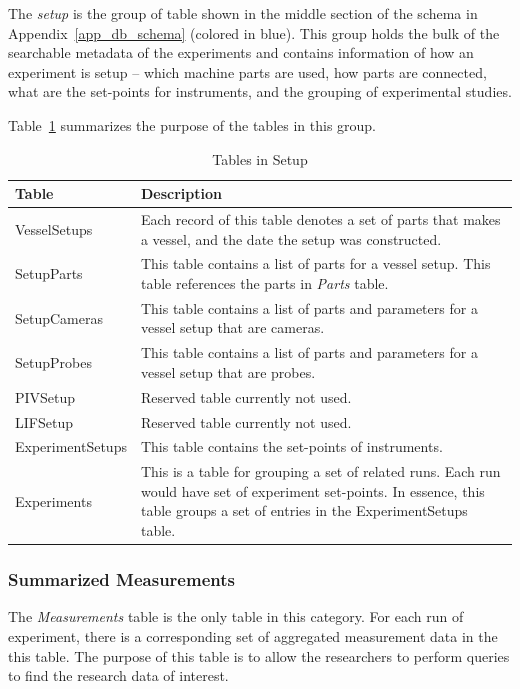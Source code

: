 \documentclass{sig-alternate}
\begin{document}
The \emph{setup} is the group of table shown in the middle section of the schema in Appendix~\ref{app_db_schema} (colored in blue). This group holds the bulk of the searchable metadata of the experiments and contains information of how an experiment is setup -- which machine parts are used, how parts are connected, what are the set-points for instruments, and the grouping of experimental studies.

Table~\ref{tb_tables_in_setup} summarizes the purpose of the tables in this group.

\begin{table}[h]
\centering
\caption{Tables in Setup}\label{tb_tables_in_setup}
\begin{tabular}{l p{5.6cm}} \hline
{\bf Table} 		& {\bf Description}\\ \hline
VesselSetups 	& Each record of this table denotes a set of parts that makes a vessel, and the date the setup was constructed.\\ \hline
SetupParts		& This table contains a list of parts for a vessel setup. This table references the parts in \emph{Parts} table.\\ \hline
SetupCameras	& This table contains a list of parts and parameters for a vessel setup that are cameras. \\ \hline
SetupProbes		&This table contains a list of parts and parameters for a vessel setup that are probes. \\ \hline
PIVSetup		& Reserved table currently not used.\\ \hline
LIFSetup		& Reserved table currently not used.\\ \hline
ExperimentSetups	& This table contains the set-points of instruments.\\ \hline
Experiments		& This is a table for grouping a set of related runs. Each run would have set of experiment set-points. In essence, this table groups a set of entries in the ExperimentSetups table.\\ \hline
\end{tabular}
\end{table}


\subsubsection{Summarized Measurements}

The \emph{Measurements} table is the only table in this category. For each run of experiment, there is a corresponding set of aggregated measurement data in the  this table. The purpose of this table is to allow the researchers to perform queries to find the research data of interest.
\end{document}
